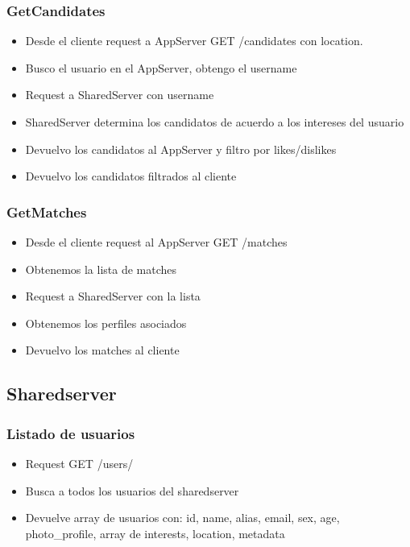 \documentclass[letterpaper,10pt,english]{sphinxmanual}
\begin{document}
\subsubsection{GetCandidates}
\label{manuals:getcandidates}\begin{itemize}
\item {} 
Desde el cliente request a AppServer  GET /candidates con location.

\item {} 
Busco el usuario en el AppServer, obtengo el username

\item {} 
Request a SharedServer con username

\item {} 
SharedServer determina los candidatos de acuerdo a los intereses del usuario

\item {} 
Devuelvo los candidatos al AppServer y filtro por likes/dislikes

\item {} 
Devuelvo los candidatos filtrados al cliente

\end{itemize}


\subsubsection{GetMatches}
\label{manuals:getmatches}\begin{itemize}
\item {} 
Desde el cliente request al AppServer GET /matches

\item {} 
Obtenemos la lista de matches

\item {} 
Request a SharedServer con la lista

\item {} 
Obtenemos los perfiles asociados

\item {} 
Devuelvo los matches al cliente

\end{itemize}


\subsection{Sharedserver}
\label{manuals:sharedserver}

\subsubsection{Listado de usuarios}
\label{manuals:listado-de-usuarios}\begin{itemize}
\item {} 
Request GET /users/

\item {} 
Busca a todos los usuarios del sharedserver

\item {} 
Devuelve array de usuarios con: id, name, alias, email, sex, age, photo\_profile, array de interests, location, metadata

\end{itemize}
\end{document}
